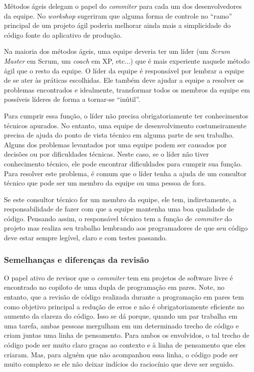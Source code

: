 Métodos ágeis delegam o papel do \emph{commiter} para cada um dos
desenvolvedores da equipe. No \emph{workshop} sugeriram que alguma
forma de controle no ``ramo'' principal de um projeto ágil poderia
melhorar ainda mais a simplicidade do código fonte do aplicativo de
produção.

Na maioria dos métodos ágeis, uma equipe deveria ter um líder (um
\emph{Scrum Master} em Scrum, um \emph{coach} em XP, etc...)  que é
mais experiente naquele método ágil que o resto da equipe. O líder da
equipe é responsável por lembrar a equipe de se ater às práticas
escolhidas. Ele também deve ajudar a equipe a resolver os problemas
encontrados e idealmente, transformar todos os membros da equipe em
possíveis líderes de forma a tornar-se ``inútil''.

Para cumprir essa função, o líder não precisa obrigatoriamente ter
conhecimentos técnicos apurados. No entanto, uma equipe de
desenvolvimento costumeiramente precisa de ajuda do ponto de vista
técnico em alguma parte de seu trabalho. Alguns dos problemas
levantados por uma equipe podem ser causados por decisões ou por
dificuldades técnicas. Neste caso, se o líder não tiver conhecimento
técnico, ele pode encontrar dificuldades para cumprir sua função. Para
resolver este problema, é comum que o líder tenha a ajuda de um
consultor técnico que pode ser um membro da equipe ou uma pessoa de
fora.

Se este consultor técnico for um membro da equipe, ele tem,
indiretamente, a responsabilidade de fazer com que a equipe mantenha
uma boa qualidade de código. Pensando assim, o responsável técnico tem
a função de \emph{commiter} do projeto mas realiza seu trabalho
lembrando aos programadores de que seu código deve estar sempre
legível, claro e com testes passando.

\subsubsection{Semelhanças e diferenças da revisão}

O papel ativo de revisor que o \emph{commiter} tem em projetos de
software livre é encontrado no copiloto de uma dupla de programação em
pares. Note, no entanto, que a revisão de código realizada durante a
programação em pares tem como objetivo principal a redução de erros e
não é obrigatoriamente eficiente no aumento da clareza do código. Isso
se dá porque, quando um par trabalha em uma tarefa, ambas pessoas
mergulham em um determinado trecho de código e criam juntas uma linha
de pensamento. Para ambos os envolvidos, o tal trecho de código pode
ser muito claro graças ao contexto e à linha de pensamento que eles
criaram. Mas, para alguém que não acompanhou essa linha, o código pode
ser muito complexo se ele não deixar indícios do raciocínio que deve
ser seguido.

